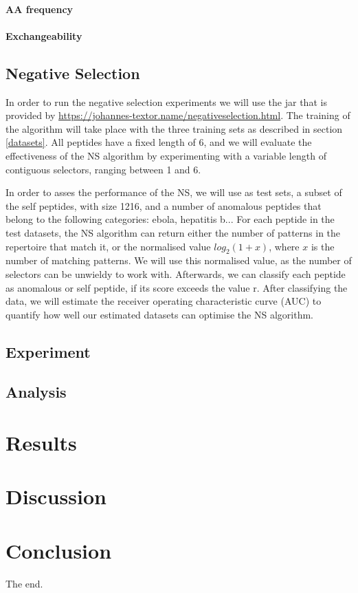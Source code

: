 \documentclass{article}
\begin{document}
\paragraph{AA frequency}

\paragraph{Exchangeability}





\subsection{Negative Selection}
In order to run the negative selection experiments we will use the jar that is provided by \url{https://johannes-textor.name/negativeselection.html}.
The training of the algorithm will take place with the three training sets as described in section \ref{datasets}.
All peptides have a fixed length of 6, and we will evaluate the effectiveness of the NS algorithm by experimenting 
with a variable length of contiguous selectors, ranging between 1 and 6. 

In order to asses the performance of the NS, we  will use as test sets, a subset of the self peptides, with size 1216, 
and a number of anomalous peptides that belong to the following categories: ebola, hepatitis b... For each peptide in 
the test datasets, the NS algorithm can return either the number of patterns in the repertoire that match it, or the 
normalised value $log_2(1 + x)$, where $x$ is the number of matching patterns. We will use this normalised value, as the 
number of selectors can be unwieldy to work with. Afterwards, we can classify each peptide as anomalous or self peptide, 
if its score exceeds the value r. After classifying the data, we will estimate the receiver operating characteristic 
curve (AUC) to quantify how well our estimated datasets can optimise the NS algorithm.


\subsection{Experiment}


\subsection{Analysis}


\section{Results}



\section{Discussion}



\section{Conclusion}

The end.

\printbibliography

\appendix
\end{document}
